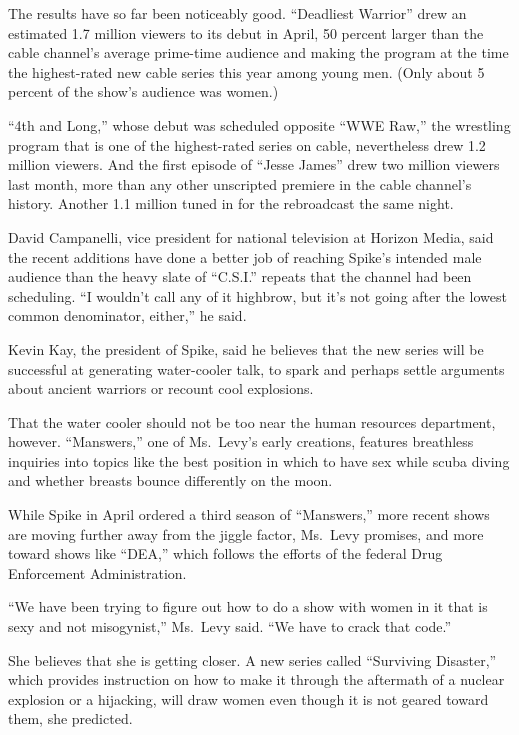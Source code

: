 \documentclass[12pt,a4paper,onecolumn]{article}
\begin{document}
The results have so far been noticeably good. ``Deadliest Warrior'' drew an estimated 1.7 million
viewers to its debut in April, 50 percent larger than the cable channel's average prime-time
audience and making the program at the time the highest-rated new cable series this year among young
men. (Only about 5 percent of the show's audience was women.)

``4th and Long,'' whose debut was scheduled opposite ``WWE Raw,'' the wrestling program that is one
of the highest-rated series on cable, nevertheless drew 1.2 million viewers. And the first episode
of ``Jesse James'' drew two million viewers last month, more than any other unscripted premiere in
the cable channel's history. Another 1.1 million tuned in for the rebroadcast the same night.

David Campanelli, vice president for national television at Horizon Media, said the recent additions
have done a better job of reaching Spike's intended male audience than the heavy slate of ``C.S.I.''
repeats that the channel had been scheduling. ``I wouldn't call any of it highbrow, but it's not
going after the lowest common denominator, either,'' he said.

Kevin Kay, the president of Spike, said he believes that the new series will be successful at
generating water-cooler talk, to spark and perhaps settle arguments about ancient warriors or
recount cool explosions.

That the water cooler should not be too near the human resources department, however. ``Manswers,''
one of Ms.~Levy's early creations, features breathless inquiries into topics like the best position
in which to have sex while scuba diving and whether breasts bounce differently on the moon.

While Spike in April ordered a third season of ``Manswers,'' more recent shows are moving further
away from the jiggle factor, Ms.~Levy promises, and more toward shows like ``DEA,'' which follows
the efforts of the federal Drug Enforcement Administration.

``We have been trying to figure out how to do a show with women in it that is sexy and not
misogynist,'' Ms.~Levy said. ``We have to crack that code.''

She believes that she is getting closer. A new series called ``Surviving Disaster,'' which provides
instruction on how to make it through the aftermath of a nuclear explosion or a hijacking, will draw
women even though it is not geared toward them, she predicted.
\end{document}
